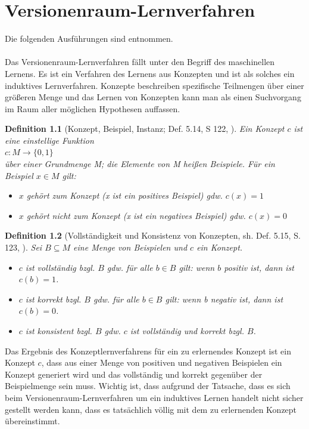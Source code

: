 \documentclass[a4paper, 11pt]{book}
\newtheorem{Def}{Definition }[section]
\begin{document}
{	\chapter{Versionenraum-Lernverfahren} \label{VRL} 
	Die folgenden Ausführungen sind \cite{BKI08} entnommen.\\
	\\
	 Das Versionenraum-Lernverfahren fällt unter den Begriff des maschinellen Lernens. Es ist ein Verfahren des Lernens aus Konzepten und ist als solches ein induktives Lernverfahren. Konzepte beschreiben spezifische Teilmengen über einer größeren Menge und das Lernen von Konzepten kann man als einen Suchvorgang im Raum aller möglichen Hypothesen auffassen. 
	\begin{Def}[Konzept, Beispiel, Instanz; Def. 5.14, S 122, \cite{BKI08}]
		Ein Konzept $ c $ ist eine einstellige Funktion\\
		\hspace{2cm} $ c: M \rightarrow \{0,1\} $\\	
		über einer Grundmenge M; die Elemente von M heißen Beispiele. Für ein Beispiel $ x \in M $ gilt:\\
		\begin{itemize}
			\item $ x $ gehört zum Konzept (x ist ein positives Beispiel) gdw. $ c(x) = 1 $
			\item $ x $ gehört nicht zum Konzept (x ist ein negatives Beispiel) gdw. $ c(x) = 0 $
		\end{itemize}
	\end{Def}
\begin{Def}[Vollständigkeit und Konsistenz von Konzepten, sh. Def. 5.15, S. 123, \cite{BKI08}]
	Sei $ B \subseteq M $ eine Menge von Beispielen und $ c $ ein Konzept.
	\begin{itemize}
		\item $ c $ ist vollständig bzgl. $ B $ gdw. für alle $ b \in B $ gilt: wenn $ b $ positiv ist, dann ist $ c(b) = 1 $.
		\item $ c $ ist korrekt bzgl. $ B $ gdw. für alle $ b \in B $ gilt: wenn b negativ ist, dann ist $ c(b) = 0 $.
		\item $ c $ ist konsistent bzgl. $ B $ gdw. $ c $ ist vollständig und korrekt bzgl. $ B $. 
	\end{itemize}
\end{Def}
Das Ergebnis des Konzeptlernverfahrens für ein zu erlernendes Konzept ist ein Konzept $ c $, dass aus einer Menge von positiven und negativen Beispielen ein Konzept generiert wird und das vollständig und korrekt gegenüber der Beispielmenge sein muss. Wichtig ist, dass aufgrund der Tatsache, dass es sich beim Versionenraum-Lernverfahren um ein induktives Lernen handelt nicht sicher gestellt werden kann, dass es tatsächlich völlig mit dem zu erlernenden Konzept übereinstimmt.
}
\end{document}
